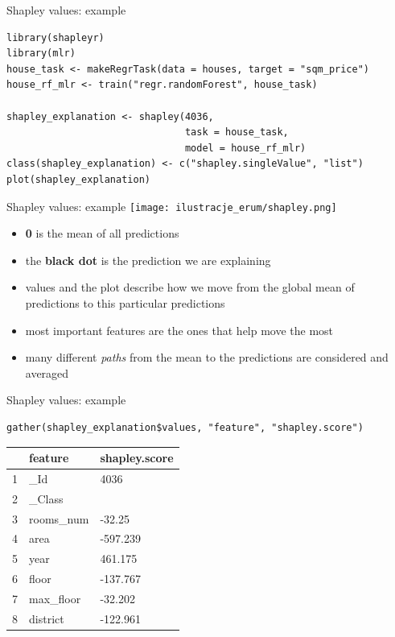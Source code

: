 \documentclass[xcolor={dvipsnames}]{beamer}
\begin{document}
\begin{frame}[fragile]{Shapley values: example}
	\begin{lstlisting}
library(shapleyr)
library(mlr)
house_task <- makeRegrTask(data = houses, target = "sqm_price")
house_rf_mlr <- train("regr.randomForest", house_task)	

shapley_explanation <- shapley(4036,
                               task = house_task,
                               model = house_rf_mlr)
class(shapley_explanation) <- c("shapley.singleValue", "list")
plot(shapley_explanation)
	\end{lstlisting}
\end{frame}

\begin{frame}[fragile]{Shapley values: example}
	\centering
	\texttt{[image: ilustracje\_erum/shapley.png]}
	\begin{itemize}
		\item \textbf{0} is the mean of all predictions
		
		\item the \textbf{black dot} is the prediction we are explaining
		
		\item values and the plot describe how we move from the global mean of predictions to this particular predictions
		
		\item most important features are the ones that help move the most
		
		\item many different \textit{paths} from the mean to the predictions are considered and averaged
	\end{itemize}
\end{frame}

\begin{frame}[fragile]{Shapley values: example}
\begin{lstlisting}
gather(shapley_explanation$values, "feature", "shapley.score")
\end{lstlisting}
\begin{table}[ht]
	\centering
	\begin{tabular}{rll}
		\hline
		& feature & shapley.score \\ 
		\hline
		1 & \_Id & 4036 \\ 
		2 & \_Class &  \\ 
		3 & rooms\_num & -32.25 \\ 
		4 & area & -597.239 \\ 
		5 & year & 461.175 \\ 
		6 & floor & -137.767 \\ 
		7 & max\_floor & -32.202 \\ 
		8 & district & -122.961 \\ 
		\hline
	\end{tabular}
\end{table}
\end{frame}
\end{document}

